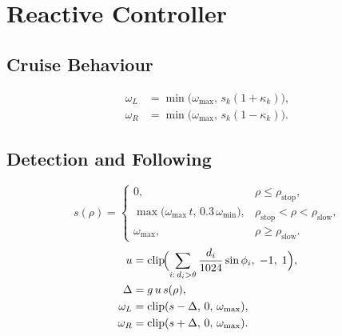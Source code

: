 \documentclass[conference]{IEEEtran}
\begin{document}
\section{Reactive Controller}

\subsection{Cruise Behaviour}
\begin{equation}
\begin{aligned}
\omega_{L} &= \min\!\bigl(\omega_{\max},\, s_{k}(1 + \kappa_{k})\bigr),\\
\omega_{R} &= \min\!\bigl(\omega_{\max},\, s_{k}(1 - \kappa_{k})\bigr).
\end{aligned}
\label{eq:cruise}
\end{equation}

\subsection{Detection and Following}
\begin{equation}
s(\rho) =
\begin{cases}
0, & \rho \leq \rho_{\text{stop}},\\[2pt]
\max\!\bigl(\omega_{\max}\, t,\, 0.3\,\omega_{\min}\bigr), & \rho_{\text{stop}} < \rho < \rho_{\text{slow}},\\[2pt]
\omega_{\max}, & \rho \geq \rho_{\text{slow}}.
\end{cases}
\label{eq:speed}
\end{equation}
\begin{equation}
\begin{aligned}
u &= \operatorname{clip}\!\Bigl(\sum_{i:\,d_i > \theta} \frac{d_i}{1024}\sin\phi_i,\; -1,\; 1\Bigr),\\
\Delta &= g\, u\, s(\rho),\\
\omega_{L} &= \operatorname{clip}(s - \Delta,\, 0,\, \omega_{\max}),\\
\omega_{R} &= \operatorname{clip}(s + \Delta,\, 0,\, \omega_{\max}).
\end{aligned}
\label{eq:steering}
\end{equation}
\end{document}
